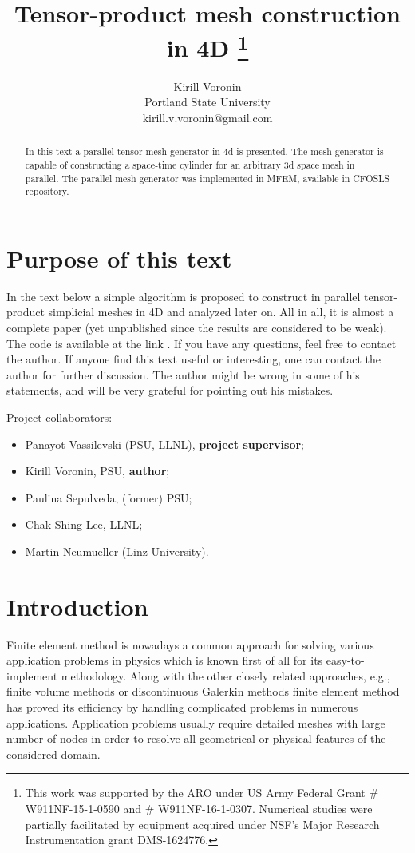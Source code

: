 \documentclass[12pt]{article}
\title{Tensor-product mesh construction in 4D \footnote{This work was supported by the ARO under US Army Federal Grant \# W911NF-15-1-0590 and \# W911NF-16-1-0307. Numerical studies were partially facilitated  by equipment acquired under NSF’s  Major
Research Instrumentation grant DMS-1624776.}}
\author{Kirill Voronin \\
Portland State University \\
kirill.v.voronin@gmail.com}
\date{}
\begin{document}
\maketitle

\begin{abstract}
In this text a parallel tensor-mesh generator in 4d is presented. The mesh generator is capable of constructing a space-time cylinder for an arbitrary 3d space mesh in parallel.
The parallel mesh generator was implemented in MFEM, available in CFOSLS repository.
\end{abstract}

\section*{Purpose of this text}
In the text below a simple algorithm is proposed to construct in parallel tensor-product simplicial meshes in 4D and analyzed later on. All in all, it is almost a complete paper (yet unpublished since the results are considered to be weak).
The code is available at the link \cite{cfosls_code}. If you have any questions, feel free to contact the author.
If anyone find this text useful or interesting, one can contact the author for further discussion. The author might be wrong in some of his statements, and will be very grateful for pointing out his mistakes.

Project collaborators:
\begin{itemize}
	\item Panayot Vassilevski (PSU, LLNL), \textbf{project supervisor};
	\item Kirill Voronin, PSU, \textbf{author};
	\item Paulina Sepulveda, (former) PSU;
	\item Chak Shing Lee, LLNL;
	\item Martin Neumueller (Linz University).
\end{itemize}

\section*{Introduction}

Finite element method is nowadays a common approach for solving various application problems in physics which is known first of all for its easy-to-implement methodology. Along with the other closely related approaches, e.g., finite volume methods or discontinuous Galerkin methods finite element method has proved its efficiency by handling complicated problems in numerous applications. Application problems usually require detailed meshes with large number of nodes in order to resolve all geometrical or physical features of the considered domain.
\end{document}
